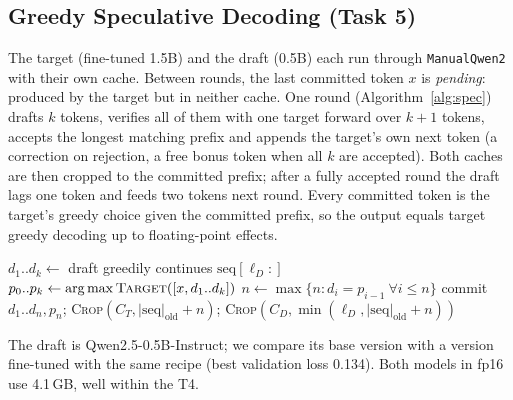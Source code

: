 \documentclass[conference]{IEEEtran}
\begin{document}
\subsection{Greedy Speculative Decoding (Task 5)}
The target (fine-tuned 1.5B) and the draft (0.5B) each run through \texttt{ManualQwen2} with their own cache. Between rounds, the last committed token $x$ is \emph{pending}: produced by the target but in neither cache. One round (Algorithm~\ref{alg:spec}) drafts $k$ tokens, verifies all of them with one target forward over $k{+}1$ tokens, accepts the longest matching prefix and appends the target's own next token (a correction on rejection, a free bonus token when all $k$ are accepted). Both caches are then cropped to the committed prefix; after a fully accepted round the draft lags one token and feeds two tokens next round. Every committed token is the target's greedy choice given the committed prefix, so the output equals target greedy decoding up to floating-point effects.

\begin{algorithm}[t]
\caption{One round of greedy speculative decoding}\label{alg:spec}
\small
\begin{algorithmic}[1]
\State $d_1..d_k \gets$ draft greedily continues $\text{seq}[\ell_D:]$ 
\State $p_0..p_k \gets \arg\max \textsc{Target}([x, d_1..d_k])$ 
\State $n \gets \max\{n: d_i = p_{i-1}\ \forall i\le n\}$
\State commit $d_1..d_n, p_n$; \textsc{Crop}$(C_T, |\text{seq}|_{\text{old}}+n)$; \textsc{Crop}$(C_D, \min(\ell_D, |\text{seq}|_{\text{old}}+n))$
\end{algorithmic}
\end{algorithm}

The draft is Qwen2.5-0.5B-Instruct; we compare its base version with a version fine-tuned with the same recipe (best validation loss 0.134). Both models in fp16 use 4.1\,GB, well within the T4.
\end{document}

